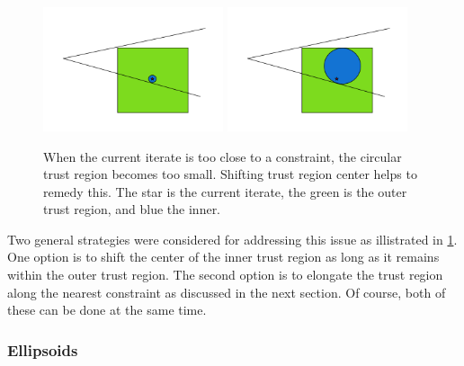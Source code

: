 \begin{figure}[h]
    \centering
    \includegraphics[width=200px]{images/small_circle.png}
    \includegraphics[width=200px]{images/shifted_center.png}
    \caption{When the current iterate is too close to a constraint, the circular trust region becomes too small. Shifting trust region center helps to remedy this. The star is the current iterate, the green is the outer trust region, and blue the inner.}
    \label{options_basis}
\end{figure}

Two general strategies were considered for addressing this issue as illistrated in \cref{options_basis}.
One option is to shift the center of the inner trust region as long as it remains within the outer trust region.
The second option is to elongate the trust region along the nearest constraint as discussed in the next section.
Of course, both of these can be done at the same time.


\subsubsection{Ellipsoids}

